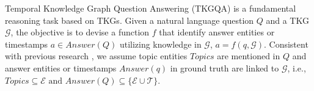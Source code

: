 
\noindent
Temporal Knowledge Graph Question Answering (TKGQA)
is a fundamental reasoning task based on TKGs. Given a natural language question $Q$ and a TKG $\mathcal{G}$, the objective is to devise a function $f$ that identify answer entities or timestamps $a \in Answer(Q)$ utilizing knowledge in $\mathcal{G}$, \ie $a = f(q, \mathcal{G})$.
Consistent with previous research \cite{sun2019pullnet, rogluo2023reasoning, tog1.0sun2023think, tog2.0ma2024think},
we assume topic entities $Topics$ are mentioned in $Q$ and answer entities or timestamps  $Answer(q)$ in ground truth are linked to $\mathcal{G}$, i.e., $Topics \subseteq \mathcal{E} \text{ and }  Answer(Q) \subseteq \{\mathcal{E} \cup \mathcal{T}\}$.




